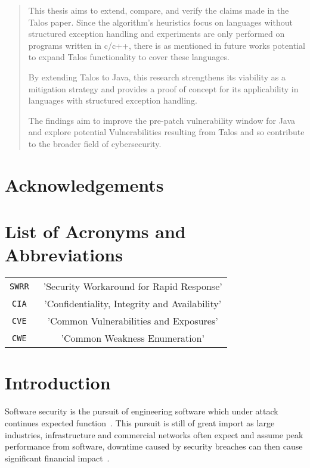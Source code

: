 \documentclass[a4paper,11pt]{report}
\begin{document}
\begin{abstract}
This thesis aims to extend, compare, and verify the claims made in the Talos paper. Since the algorithm's heuristics focus on languages without structured exception handling and experiments are only performed on programs written in c/c++, there is as mentioned in future works potential to expand Talos functionality to cover these languages.

By extending Talos to Java, this research strengthens its viability as a mitigation strategy and provides a proof of concept for its applicability in languages with structured exception handling.

The findings aim to improve the pre-patch vulnerability window for Java and explore potential Vulnerabilities resulting from Talos and so contribute to the broader field of cybersecurity. 


\end{abstract}
\cleardoublepage\chapter*{Acknowledgements}
\chapter*{List of Acronyms and Abbreviations}
\begin{center}
    \begin{tabular}{c | c}
        \verb|SWRR| &~'Security Workaround for Rapid Response' \\
        \verb|CIA| &~'Confidentiality, Integrity and Availability'\\
        \verb|CVE| &~'Common Vulnerabilities and Exposures'\\
        \verb|CWE| &~'Common Weakness Enumeration'\\
    \end{tabular}
\end{center}
\cleardoublepage\tableofcontents
\cleardoublepage\pagestyle{fancy}
\setcounter{page}{1}

\chapter{Introduction}
Software security is the pursuit of engineering software which under attack continues expected function~\cite{1281254}. This pursuit is still of great import as large industries, infrastructure and commercial networks often expect and assume peak performance from software, downtime caused by security breaches can then cause significant financial impact~\cite{cybersecurityreviewWHATCANT}.
\end{document}
